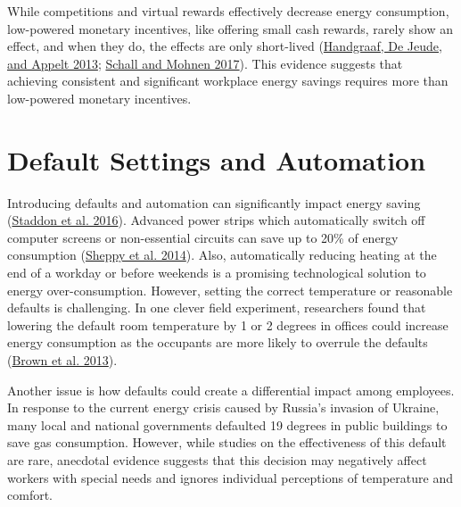 \documentclass[
  12pt,
  captions=heading]{scrreport}
\begin{document}
While competitions and virtual rewards effectively decrease energy
consumption, low-powered monetary incentives, like offering small cash
rewards, rarely show an effect, and when they do, the effects are only
short-lived (\protect\hyperlink{ref-handgraaf2013public}{Handgraaf, De
Jeude, and Appelt 2013};
\protect\hyperlink{ref-schall2017incentivizing}{Schall and Mohnen
2017}). This evidence suggests that achieving consistent and significant
workplace energy savings requires more than low-powered monetary
incentives.

\hypertarget{default-settings-and-automation}{%
\section{Default Settings and
Automation}\label{default-settings-and-automation}}

Introducing defaults and automation can significantly impact energy
saving (\protect\hyperlink{ref-staddon2016intervening}{Staddon et al.
2016}). Advanced power strips which automatically switch off computer
screens or non-essential circuits can save up to 20\% of energy
consumption (\protect\hyperlink{ref-sheppy2014reducing}{Sheppy et al.
2014}). Also, automatically reducing heating at the end of a workday or
before weekends is a promising technological solution to energy
over-consumption. However, setting the correct temperature or reasonable
defaults is challenging. In one clever field experiment, researchers
found that lowering the default room temperature by 1 or 2 degrees in
offices could increase energy consumption as the occupants are more
likely to overrule the defaults
(\protect\hyperlink{ref-brown2013testing}{Brown et al. 2013}).

Another issue is how defaults could create a differential impact among
employees. In response to the current energy crisis caused by Russia's
invasion of Ukraine, many local and national governments defaulted 19
degrees in public buildings to save gas consumption. However, while
studies on the effectiveness of this default are rare, anecdotal
evidence suggests that this decision may negatively affect workers with
special needs and ignores individual perceptions of temperature and
comfort.
\end{document}
